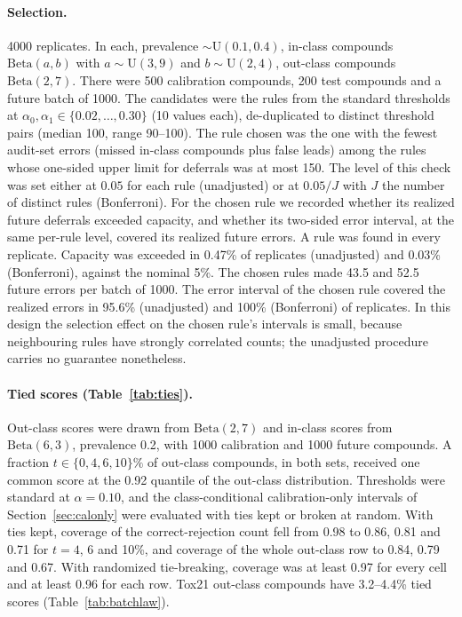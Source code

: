 \documentclass[10pt]{article}
\begin{document}
\paragraph{Selection.} 4000 replicates. In each, prevalence $\sim\mathrm U(0.1,0.4)$, in-class compounds $\mathrm{Beta}(a,b)$ with $a\sim\mathrm U(3,9)$ and $b\sim\mathrm U(2,4)$, out-class compounds $\mathrm{Beta}(2,7)$. There were 500 calibration compounds, 200 test compounds and a future batch of 1000. The candidates were the rules from the standard thresholds at $\alpha_0,\alpha_1\in\{0.02,\dots,0.30\}$ (10 values each), de-duplicated to distinct threshold pairs (median 100, range 90--100). The rule chosen was the one with the fewest audit-set errors (missed in-class compounds plus false leads) among the rules whose one-sided upper limit for deferrals was at most 150. The level of this check was set either at $0.05$ for each rule (unadjusted) or at $0.05/J$ with $J$ the number of distinct rules (Bonferroni). For the chosen rule we recorded whether its realized future deferrals exceeded capacity, and whether its two-sided error interval, at the same per-rule level, covered its realized future errors. A rule was found in every replicate. Capacity was exceeded in 0.47\% of replicates (unadjusted) and 0.03\% (Bonferroni), against the nominal 5\%. The chosen rules made 43.5 and 52.5 future errors per batch of 1000. The error interval of the chosen rule covered the realized errors in 95.6\% (unadjusted) and 100\% (Bonferroni) of replicates. In this design the selection effect on the chosen rule's intervals is small, because neighbouring rules have strongly correlated counts; the unadjusted procedure carries no guarantee nonetheless.

\paragraph{Tied scores (Table~\ref{tab:ties}).} Out-class scores were drawn from $\mathrm{Beta}(2,7)$ and in-class scores from $\mathrm{Beta}(6,3)$, prevalence 0.2, with 1000 calibration and 1000 future compounds. A fraction $t\in\{0,4,6,10\}\%$ of out-class compounds, in both sets, received one common score at the 0.92 quantile of the out-class distribution. Thresholds were standard at $\alpha=0.10$, and the class-conditional calibration-only intervals of Section~\ref{sec:calonly} were evaluated with ties kept or broken at random. With ties kept, coverage of the correct-rejection count fell from 0.98 to 0.86, 0.81 and 0.71 for $t=4$, 6 and 10\%, and coverage of the whole out-class row to 0.84, 0.79 and 0.67. With randomized tie-breaking, coverage was at least 0.97 for every cell and at least 0.96 for each row. Tox21 out-class compounds have 3.2--4.4\% tied scores (Table~\ref{tab:batchlaw}).
\end{document}
